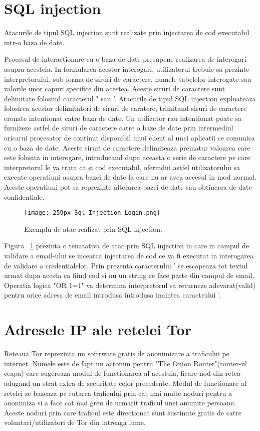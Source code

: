 \section{SQL injection}

Atacurile de tipul SQL injection sunt realizate prin injectarea de cod executabil intr-o baza de date.

Procesul de interactionare cu o baza de date presupene realizarea de interogari asupra acesteia. In formularea acestor interogari, utilizatorul trebuie sa prezinte interpretorului, sub forma de siruri de caractere, numele tabelelor interogate sau valorile unor capuri specifice din acestea. Aceste siruri de caractere sunt delimitate folosind caracterul " sau '. Atacurile de tipul SQL injection expluateaza folosirea acestor delimitatori de siruri de caratere, trimitand siruri de caractere eronate intentionat catre baza de date. Un utilizator rau intentionat poate sa furnizeze astfel de siruri de caractere catre o baze de date prin intermediul oricarui procesator de continut disponibil unui client al unei aplicatii ce comunica cu o baza de date. Aceste siruri de caractere delimiteaza prematur valoarea care este folosita in interogare, introducand dupa aceasta o serie de caractere pe care interpretorul le va trata ca si cod executabil, oferindui astfel utilizatorului sa execute operatiuni asupra bazei de date la care nu ar avea accesul in mod normal. Aceste operatiuni pot sa reprezinte alterarea bazei de date sau obtinerea de date confidentiale. \\



\begin{figure}[h]
	\centering
	\texttt{[image: 259px-Sql\_Injection\_Login.png]}
	\caption{Exemplu de atac realizat prin SQL injection.}
	\label{fig:sqli-example}
\end{figure}

Figura ~\ref{fig:sqli-example} prezinta o tenatativa de atac prin SQL injection in care in campul de validare a email-ului se incearca injectarea de cod ce va fi executat in interogarea de validare a credentialelor. Prin prezenta caracterului ' se escapeaza tot textul urmat dupa acesta ca fiind cod si nu un string ce face parte din campul de email. Operatia logica "OR 1=1" va determina interpretorul sa returneze adevarat(valid) pentru orice adresa de email introdusa introdusa inaintea caractrului '. \\


\section{Adresele IP ale retelei Tor}
Reteaua Tor reprezinta un softrware gratis de anonimizare a traficului pe internet. Numele este de fapt un actonim pentru "The Onion Router"(router-ul ceapa) care sugereaza modul de functionarea al acestuia, ficare nod din retea adugand un strat extra de securitate celor precedente. Modul de functionare al retelei se bazeaza pe rutarea traficului prin cat mai multe noduri pentru a anonimiza si a face cat mai greu de urmarit traficul unei anumite persoane. Aceste noduri prin care traficul este directionat sunt sustinute gratis de catre voluntari/utilizatori de Tor din intreaga lume.

